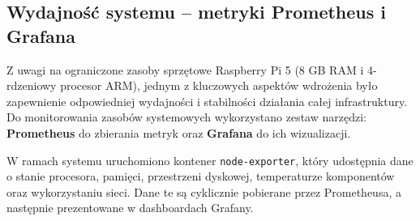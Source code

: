 \documentclass[
    left=2.5cm,         %
    right=2.5cm,        %
    top=2.5cm,          %
    bottom=3cm,         %
    bindingoffset=6mm,  %
    nohyphenation=true %
]{eiti/eiti-thesis} %
\begin{document}
\subsection{Wydajność systemu – metryki Prometheus i Grafana}

Z uwagi na ograniczone zasoby sprzętowe Raspberry Pi 5 (8 GB RAM i 4-rdzeniowy procesor ARM), jednym z kluczowych aspektów wdrożenia było zapewnienie odpowiedniej wydajności i stabilności działania całej infrastruktury. Do monitorowania zasobów systemowych wykorzystano zestaw narzędzi: \textbf{Prometheus} do zbierania metryk oraz \textbf{Grafana} do ich wizualizacji.

W ramach systemu uruchomiono kontener \texttt{node-exporter}, który udostępnia dane o stanie procesora, pamięci, przestrzeni dyskowej, temperaturze komponentów oraz wykorzystaniu sieci. Dane te są cyklicznie pobierane przez Prometheusa, a następnie prezentowane w dashboardach Grafany.
\end{document}
